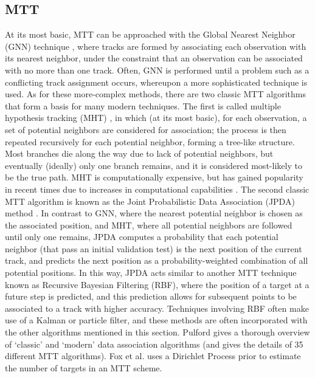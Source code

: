 \documentclass{article}
\begin{document}
\subsection*{MTT}
\vspace{6pt}
At its most basic, MTT can be approached with the Global Nearest Neighbor (GNN) technique \cite{blackman_2004}, where tracks are formed by associating each observation with its nearest neighbor, under the constraint that an observation can be associated with no more than one track. Often, GNN is performed until a problem such as a conflicting track assignment occurs, whereupon a more sophisticated technique is used. As for these more-complex methods, there are two classic MTT algorithms that form a basis for many modern techniques. The first is called multiple hypothesis tracking (MHT) \cite{singer_1974, reid_1979, blackman_2004}, in which (at its most basic), for each observation, a set of potential neighbors are considered for association; the process is then repeated recursively for each potential neighbor, forming a tree-like structure. Most branches die along the way due to lack of potential neighbors, but eventually (ideally) only one branch remains, and it is considered most-likely to be the true path. MHT is computationally expensive, but has gained popularity in recent times due to increases in computational capabilities \cite{blackman_2004}. The second classic MTT algorithm is known as the Joint Probabilistic Data Association (JPDA) method \cite{barshalom_1975, kirubarajan_2004}. In contrast to GNN, where the nearest potential neighbor is chosen as the associated position, and MHT, where all potential neighbors are followed until only one remains, JPDA computes a probability that each potential neighbor (that pass an initial validation test) is the next position of the current track, and predicts the next position as a probability-weighted combination of all potential positions. In this way, JPDA acts similar to another MTT technique known as Recursive Bayesian Filtering (RBF), where the position of a target at a future step is predicted, and this prediction allows for subsequent points to be associated to a track with higher accuracy. Techniques involving RBF often make use of a Kalman or particle filter, and these methods are often incorporated with the other algorithms mentioned in this section. Pulford \cite{pulford_2005} gives a thorough overview of `classic' and `modern' data association algorithms (and gives the details of 35 different MTT algorithms). Fox et al. \cite{fox_2006} uses a Dirichlet Process prior to estimate the number of targets in an MTT scheme. \\
\end{document}
